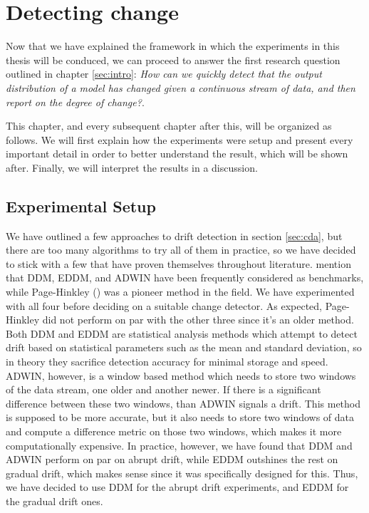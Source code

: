 \documentclass[12pt]{extreport}
\begin{document}
\chapter{Detecting change} \label{sec:detecting}

Now that we have explained the framework in which the experiments in this thesis will be conduced, we can proceed to answer the first research question outlined in chapter \ref{sec:intro}: \emph{How can we quickly detect that the output distribution of a model has changed given a continuous stream of data, and then report on the degree of change?}.

This chapter, and every subsequent chapter after this, will be organized as follows. We will first explain how the experiments were setup and present every important detail in order to better understand the result, which will be shown after. Finally, we will interpret the results in a discussion.

\section{Experimental Setup}

We have outlined a few approaches to drift detection in section \ref{sec:cda}, but there are too many algorithms to try all of them in practice, so we have decided to stick with a few that have proven themselves throughout literature. \cite{mcdiarmid} mention that DDM, EDDM, and ADWIN have been frequently considered as benchmarks, while Page-Hinkley (\cite{pagehinkley}) was a pioneer method in the field. We have experimented with all four before deciding on a suitable change detector. As expected, Page-Hinkley did not perform on par with the other three since it's an older method. Both DDM and EDDM are statistical analysis methods which attempt to detect drift based on statistical parameters such as the mean and standard deviation, so in theory they sacrifice detection accuracy for minimal storage and speed. ADWIN, however, is a window based method which needs to store two windows of the data stream, one older and another newer. If there is a significant difference between these two windows, than ADWIN signals a drift. This method is supposed to be more accurate, but it also needs to store two windows of data and compute a difference metric on those two windows, which makes it more computationally expensive. In practice, however, we have found that DDM and ADWIN perform on par on abrupt drift, while EDDM outshines the rest on gradual drift, which makes sense since it was specifically designed for this. Thus, we have decided to use DDM for the abrupt drift experiments, and EDDM for the gradual drift ones.
\end{document}
